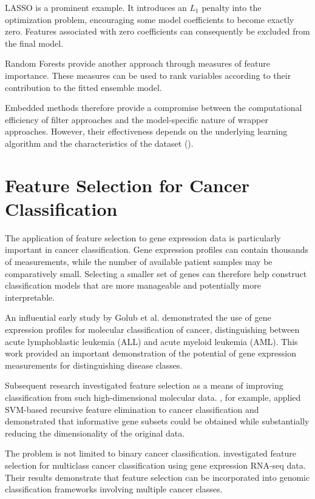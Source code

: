 LASSO is a prominent example. It introduces an $L_1$ penalty into the optimization problem, encouraging some model coefficients to become exactly zero. Features associated with zero coefficients can consequently be excluded from the final model.

Random Forests provide another approach through measures of feature importance. These measures can be used to rank variables according to their contribution to the fitted ensemble model.

Embedded methods therefore provide a compromise between the computational efficiency of filter approaches and the model-specific nature of wrapper approaches. However, their effectiveness depends on the underlying learning algorithm and the characteristics of the dataset (\cite{tang2013feature,li2017feature}).

\section{Feature Selection for Cancer Classification}

The application of feature selection to gene expression data is particularly important in cancer classification. Gene expression profiles can contain thousands of measurements, while the number of available patient samples may be comparatively small. Selecting a smaller set of genes can therefore help construct classification models that are more manageable and potentially more interpretable.

An influential early study by Golub et al. demonstrated the use of gene expression profiles for molecular classification of cancer, distinguishing between acute lymphoblastic leukemia (ALL) and acute myeloid leukemia (AML). This work provided an important demonstration of the potential of gene expression measurements for distinguishing disease classes.

Subsequent research investigated feature selection as a means of improving classification from such high-dimensional molecular data. \citet{guyon_gene_2002}, for example, applied SVM-based recursive feature elimination to cancer classification and demonstrated that informative gene subsets could be obtained while substantially reducing the dimensionality of the original data.

The problem is not limited to binary cancer classification. \citet{garcia-diaz_unsupervised_2020} investigated feature selection for multiclass cancer classification using gene expression RNA-seq data. Their results demonstrate that feature selection can be incorporated into genomic classification frameworks involving multiple cancer classes.

